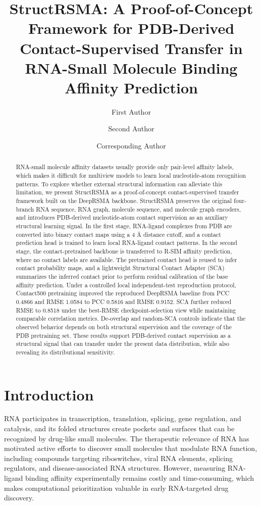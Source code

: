\documentclass[journal=jcisd8,manuscript=article]{achemso}
\title{StructRSMA: A Proof-of-Concept Framework for PDB-Derived Contact-Supervised Transfer in RNA-Small Molecule Binding Affinity Prediction}
\author{First Author}
\affiliation{Department of Bioinformatics, Placeholder University, Placeholder City, Placeholder Country}
\author{Second Author}
\affiliation{Department of Pharmaceutical Sciences, Placeholder University, Placeholder City, Placeholder Country}
\author{Corresponding Author}
\affiliation{Department of Bioinformatics, Placeholder University, Placeholder City, Placeholder Country}
\begin{document}
\begin{abstract}
RNA-small molecule affinity datasets usually provide only pair-level affinity labels, which makes it difficult for multiview models to learn local nucleotide-atom recognition patterns. To explore whether external structural information can alleviate this limitation, we present StructRSMA as a proof-of-concept contact-supervised transfer framework built on the DeepRSMA backbone. StructRSMA preserves the original four-branch RNA sequence, RNA graph, molecule sequence, and molecule graph encoders, and introduces PDB-derived nucleotide-atom contact supervision as an auxiliary structural learning signal. In the first stage, RNA-ligand complexes from PDB are converted into binary contact maps using a 4 \AA{} distance cutoff, and a contact prediction head is trained to learn local RNA-ligand contact patterns. In the second stage, the contact-pretrained backbone is transferred to R-SIM affinity prediction, where no contact labels are available. The pretrained contact head is reused to infer contact probability maps, and a lightweight Structural Contact Adapter (SCA) summarizes the inferred contact prior to perform residual calibration of the base affinity prediction. Under a controlled local independent-test reproduction protocol, Contact500 pretraining improved the reproduced DeepRSMA baseline from PCC 0.4866 and RMSE 1.0584 to PCC 0.5816 and RMSE 0.9152. SCA further reduced RMSE to 0.8518 under the best-RMSE checkpoint-selection view while maintaining comparable correlation metrics. De-overlap and random-SCA controls indicate that the observed behavior depends on both structural supervision and the coverage of the PDB pretraining set. These results support PDB-derived contact supervision as a structural signal that can transfer under the present data distribution, while also revealing its distributional sensitivity.
\end{abstract}

\section{Introduction}

RNA participates in transcription, translation, splicing, gene regulation, and catalysis, and its folded structures create pockets and surfaces that can be recognized by drug-like small molecules.\cite{Caprara2000RNA,ChildsDisney2022TargetingRNA,Warner2018Principles} The therapeutic relevance of RNA has motivated active efforts to discover small molecules that modulate RNA function, including compounds targeting riboswitches, viral RNA elements, splicing regulators, and disease-associated RNA structures.\cite{Costales2020How,Yu2020RNADrugs} However, measuring RNA-ligand binding affinity experimentally remains costly and time-consuming, which makes computational prioritization valuable in early RNA-targeted drug discovery.\cite{Kairys2019BindingAffinity}
\end{document}
